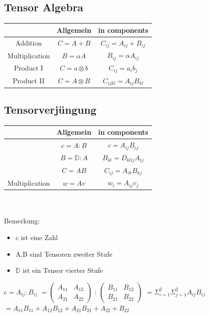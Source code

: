 \documentclass[a4paper]{scrartcl}
\begin{document}
\subsection{Tensor Algebra}
\begin{tabular}{|c|c|c|}
\hline  & Allgemein & in components \\ 
\hline Addition & $C=A+B$ & $C_{ij}=A_{ij}+B_{ij}$ \\ 
\hline Multiplication& $B=\alpha A$ & $B_{ij}=\alpha A_{ij}$ \\ 
\hline Product I & $C = a \otimes b $ & $C_{ij} = a_i b_j$ \\ 
\hline Product II& $C = A \otimes B $ & $C_{ijkl} = A_{ij} B_{kl}$ \\
\hline 
\end{tabular} 

\subsection{Tensorverjüngung}
\begin{tabular}{|c|c|c|}
\hline  & Allgemein & in components \\ 
\hline  & $c=A:B$ & $c=A_{ij}B_{ij}$ \\ 
\hline  & $B=\mathbb{D}:A$ & $B_{kl}=D_{klij}A_{ij}$ \\
\hline  & $C=AB$ & $C_{ij}=A_{ik}B_{kj}$ \\
\hline Multiplication & $w=Av$ & $w_i=A_{ij}v_{j}$ \\
\hline 
\end{tabular} 
\\
\\
Bemerkung:
\begin{itemize}
\item c ist eine Zahl
\item A,B sind Tensoren zweiter Stufe
\item $\mathbb{D}$ ist ein Tensor vierter Stufe
\end{itemize} 


$ 
c = A_{ij}:B_{ij} 
$
$
=
\begin{pmatrix}
A_{11} & A_{12} \\ 
A_{21} & A_{22}
\end{pmatrix} 
$
:
$
\begin{pmatrix}
B_{11} & B_{12} \\ 
B_{21} & B_{22}
\end{pmatrix} 
$
$
=\varSigma_{i=1}^{2}\varSigma_{j=1}^{2}A_{ij}B_{ij}
$
$
=A_{11}B_{11}+A_{12}B_{12}+A_{21}B_{21}+A_{22}+B_{22}
$
\end{document}
